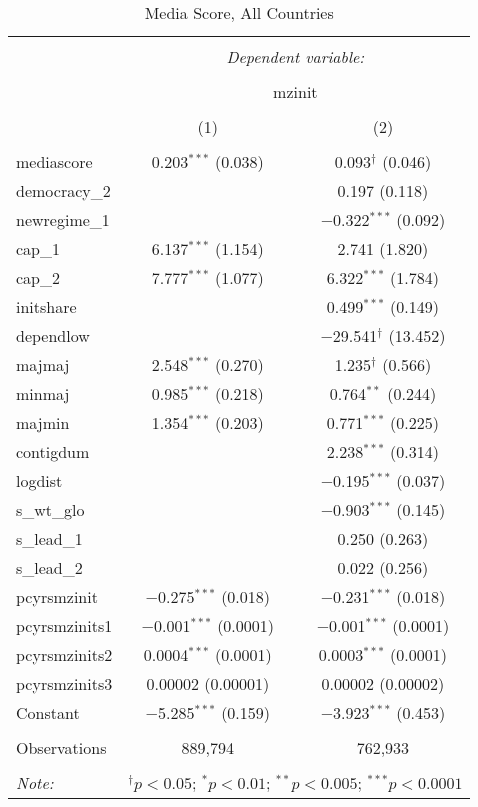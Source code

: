 
\begin{table}[!htbp] \centering 
  \caption{Media Score, All Countries} 
  \label{} 
\begin{tabular}{@{\extracolsep{5pt}}lcc} 
\\[-1.8ex]\hline 
\hline \\[-1.8ex] 
 & \multicolumn{2}{c}{\textit{Dependent variable:}} \\ 
\cline{2-3} 
\\[-1.8ex] & \multicolumn{2}{c}{mzinit} \\ 
\\[-1.8ex] & (1) & (2)\\ 
\hline \\[-1.8ex] 
 mediascore & 0.203$^{***}$ (0.038) & 0.093$^{\dagger}$ (0.046) \\ 
  democracy\_2 &  & 0.197 (0.118) \\ 
  newregime\_1 &  & $-$0.322$^{***}$ (0.092) \\ 
  cap\_1 & 6.137$^{***}$ (1.154) & 2.741 (1.820) \\ 
  cap\_2 & 7.777$^{***}$ (1.077) & 6.322$^{***}$ (1.784) \\ 
  initshare &  & 0.499$^{***}$ (0.149) \\ 
  dependlow &  & $-$29.541$^{\dagger}$ (13.452) \\ 
  majmaj & 2.548$^{***}$ (0.270) & 1.235$^{\dagger}$ (0.566) \\ 
  minmaj & 0.985$^{***}$ (0.218) & 0.764$^{**}$ (0.244) \\ 
  majmin & 1.354$^{***}$ (0.203) & 0.771$^{***}$ (0.225) \\ 
  contigdum &  & 2.238$^{***}$ (0.314) \\ 
  logdist &  & $-$0.195$^{***}$ (0.037) \\ 
  s\_wt\_glo &  & $-$0.903$^{***}$ (0.145) \\ 
  s\_lead\_1 &  & 0.250 (0.263) \\ 
  s\_lead\_2 &  & 0.022 (0.256) \\ 
  pcyrsmzinit & $-$0.275$^{***}$ (0.018) & $-$0.231$^{***}$ (0.018) \\ 
  pcyrsmzinits1 & $-$0.001$^{***}$ (0.0001) & $-$0.001$^{***}$ (0.0001) \\ 
  pcyrsmzinits2 & 0.0004$^{***}$ (0.0001) & 0.0003$^{***}$ (0.0001) \\ 
  pcyrsmzinits3 & 0.00002 (0.00001) & 0.00002 (0.00002) \\ 
  Constant & $-$5.285$^{***}$ (0.159) & $-$3.923$^{***}$ (0.453) \\ 
 \hline \\[-1.8ex] 
Observations & 889,794 & 762,933 \\ 
\hline 
\hline \\[-1.8ex] 
\textit{Note:}  & \multicolumn{2}{r}{$^{\dagger} p<0.05$; $^{*} p<0.01$; $^{**} p<0.005$; $^{***} p<0.0001$} \\ 
\end{tabular} 
\end{table} 
